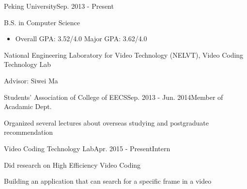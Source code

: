 \documentclass{joel_cv}
\begin{document}
\begin{cvHeader} 
\end{cvHeader}

%
%

\begin{sectionContentSimple}{Peking University}{Sep. 2013 - Present}
	\item B.S. in Computer Science
	\begin{itemize}
		\item Overall GPA: 3.52/4.0 \quad Major GPA: 3.62/4.0
	\end{itemize}
	\item National Engineering Laboratory for Video Technology (NELVT), Video Coding Technology Lab
	\item Advisor: Siwei Ma
\end{sectionContentSimple}

%
%


\begin{sectionContentNormal}{Students' Association of College of EECS}{Sep. 2013 - Jun. 2014}{Member of Acadamic Dept.}
	\item Organized several lectures about overseas studying and postgraduate recommendation
\end{sectionContentNormal}

\begin{sectionContentNormal}{Video Coding Technology Lab}{Apr. 2015 - Present}{Intern}
	\item Did research on High Efficiency Video Coding
	\item Building an application that can search for a specific frame in a video
\end{sectionContentNormal}

%
%

\end{document}
